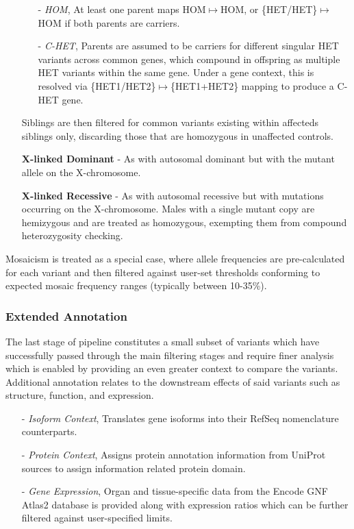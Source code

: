 \documentclass{bioinfo}
\begin{document}
\begin{methods}
\begin{itemize}
{	\begin{itemize}
	\item[-]{\it HOM}{, At least one parent maps HOM$\mapsto$HOM, or \{HET/HET\}$\mapsto$HOM if both parents are carriers.}
	\item[-]{\it C-HET}{, Parents are assumed to be carriers for different singular HET variants across common genes, which compound in offspring as multiple HET variants within the same gene. Under a gene context, this is resolved via \{HET1/HET2\}$\mapsto$\{HET1+HET2\} mapping to produce a C-HET gene.}
	\end{itemize}

Siblings are then filtered for common variants existing within affecteds siblings only, discarding those that are homozygous in unaffected controls.
}

\item[]{\bf X-linked Dominant}{ - As with autosomal dominant but with the mutant allele on the X-chromosome.}

\item[]{\bf X-linked Recessive}{ - As with autosomal recessive but with mutations occurring on the X-chromosome. Males with a single mutant copy are hemizygous and are treated as homozygous, exempting them from compound heterozygosity checking.}
\end{itemize}

Mosaicism is treated as a special case, where allele frequencies are pre-calculated for each variant and then filtered against user-set thresholds conforming to expected mosaic frequency ranges (typically between 10-35\%).




\subsubsection{Extended Annotation}

The last stage of pipeline constitutes a small subset of variants which have successfully passed through the main filtering stages and require finer analysis which is enabled by providing an even greater context to compare the variants. Additional annotation relates to the downstream effects of said variants such as structure, function, and expression.

\begin{itemize}
\item[-]{\it Isoform Context}{, Translates gene isoforms into their RefSeq nomenclature counterparts.}
\item[-]{\it Protein Context}{, Assigns protein annotation information from UniProt sources to assign information related protein domain.}
\item[-]{\it Gene Expression}{, Organ and tissue-specific data from the Encode GNF Atlas2 database is provided along with expression ratios which can be further filtered against user-specified limits.}
\end{itemize}

\end{methods}
\end{document}
